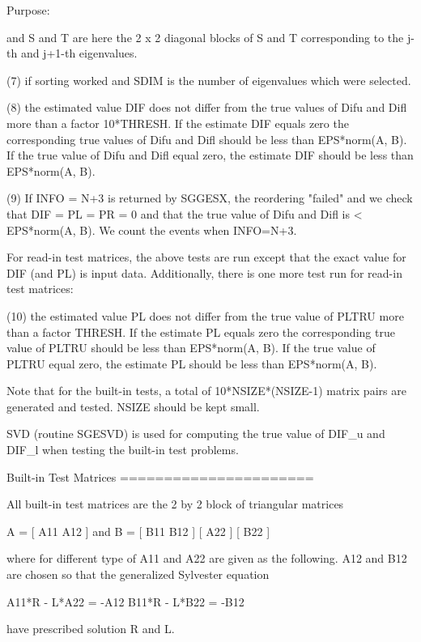 \begin{DoxyParagraph}{Purpose\+: }
\begin{DoxyVerb}
           and S and T are here the 2 x 2 diagonal blocks of S and T
           corresponding to the j-th and j+1-th eigenvalues.

 (7)   if sorting worked and SDIM is the number of eigenvalues
       which were selected.

 (8)   the estimated value DIF does not differ from the true values of
       Difu and Difl more than a factor 10*THRESH. If the estimate DIF
       equals zero the corresponding true values of Difu and Difl
       should be less than EPS*norm(A, B). If the true value of Difu
       and Difl equal zero, the estimate DIF should be less than
       EPS*norm(A, B).

 (9)   If INFO = N+3 is returned by SGGESX, the reordering "failed"
       and we check that DIF = PL = PR = 0 and that the true value of
       Difu and Difl is < EPS*norm(A, B). We count the events when
       INFO=N+3.

 For read-in test matrices, the above tests are run except that the
 exact value for DIF (and PL) is input data.  Additionally, there is
 one more test run for read-in test matrices:

 (10)  the estimated value PL does not differ from the true value of
       PLTRU more than a factor THRESH. If the estimate PL equals
       zero the corresponding true value of PLTRU should be less than
       EPS*norm(A, B). If the true value of PLTRU equal zero, the
       estimate PL should be less than EPS*norm(A, B).

 Note that for the built-in tests, a total of 10*NSIZE*(NSIZE-1)
 matrix pairs are generated and tested. NSIZE should be kept small.

 SVD (routine SGESVD) is used for computing the true value of DIF_u
 and DIF_l when testing the built-in test problems.

 Built-in Test Matrices
 ======================

 All built-in test matrices are the 2 by 2 block of triangular
 matrices

          A = [ A11 A12 ]    and      B = [ B11 B12 ]
              [     A22 ]                 [     B22 ]

 where for different type of A11 and A22 are given as the following.
 A12 and B12 are chosen so that the generalized Sylvester equation

          A11*R - L*A22 = -A12
          B11*R - L*B22 = -B12

 have prescribed solution R and L.


\end{DoxyVerb}
\end{DoxyParagraph}
